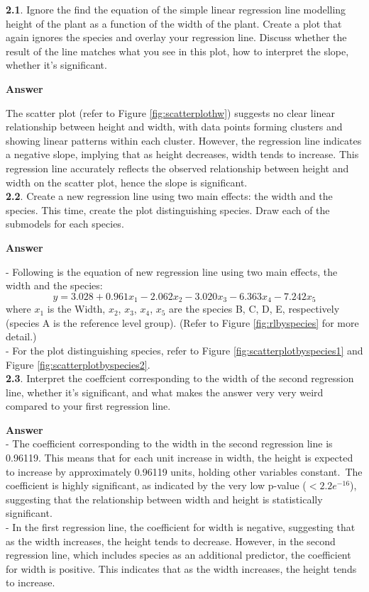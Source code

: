 \documentclass[12pt,doublespace]{article}
\begin{document}
	\textbf{2.1}. Ignore the find the equation of the simple linear regression line modelling height of the plant as a function of the width of the plant. Create a plot that again ignores the species and overlay your regression line. Discuss whether the result of the line matches what you see in this plot, how to interpret the slope, whether it’s significant.

	\textbf{Answer}

	The scatter plot (refer to Figure \ref{fig:scatterplothw}) suggests no clear linear relationship between height and width, with data points forming clusters and showing linear patterns within each cluster. However, the regression line indicates a negative slope, implying that as height decreases, width tends to increase. This regression line accurately reflects the observed relationship between height and width on the scatter plot, hence the slope is significant. \\
	
	\textbf{2.2}. Create a new regression line using two main effects: the width and the species. This time, create the plot distinguishing species. Draw each of the submodels for each species.

	\textbf{Answer}
	
 	- Following is the equation of new regression line using two main effects, the width and the species:
 	$$y = 3.028 + 0.961x_{1} - 2.062x_{2} - 3.020x_{3} -6.363x_{4} -7.242x_{5}$$
 	where $x_{1}$ is the Width, $x_{2}$, $x_{3}$, $x_{4}$, $x_{5}$ are the species B, C, D, E, respectively (species A is the reference level group). 
 	(Refer to Figure \ref{fig:rlbyspecies} for more detail.) \\
	
	-  For the plot distinguishing species, refer to Figure \ref{fig:scatterplotbyspecies1} and Figure \ref{fig:scatterplotbyspecies2}. \\
		
	
	\textbf{2.3}. Interpret the coeffcient corresponding to the width of the second regression line, whether it’s significant, and what makes the answer very very weird compared to your first regression line.
	
	\textbf{Answer}\\
	- The coefficient corresponding to the width in the second regression line is 0.96119. This means that for each unit increase in width, the height is expected to increase by approximately 0.96119 units, holding other variables constant.\
	The coefficient is highly significant, as indicated by the very low p-value ($< 2.2e^{-16}$), suggesting that the relationship between width and height is statistically significant.
	\\
	- In the first regression line, the coefficient for width is negative, suggesting that as the width increases, the height tends to decrease. However, in the second regression line, which includes species as an additional predictor, the coefficient for width is positive. This indicates  that as the width increases, the height tends to increase.\\
	
\end{document}
